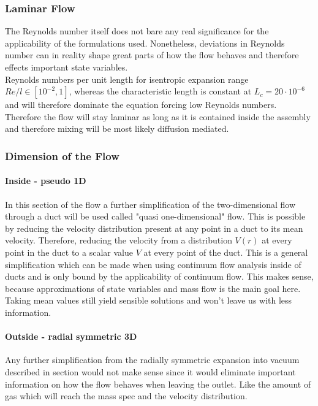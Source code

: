 \subsubsection{Laminar Flow}

	The Reynolds number itself does not bare any real significance for the applicability of the formulations used. Nonetheless, deviations in Reynolds number can in reality shape great parts of how the flow behaves and therefore effects important state variables.\\
	Reynolds numbers per unit length for isentropic expansion range $Re/l \in [10^{-2}, 1]$, whereas the characteristic length is constant at $L_c = 20\cdot 10^{-6}$ and will therefore dominate the equation forcing low Reynolds numbers. \cite{ames1953compressible}\\
	Therefore the flow will stay laminar as long as it is contained inside the assembly and therefore mixing will be most likely diffusion mediated.
	\cite{comsol_microfluidics_guide}
	
\subsubsection{Dimension of the Flow}

	\paragraph{Inside - pseudo 1D}

		In this section of the flow a further simplification of the two-dimensional flow through a duct will be used called "quasi one-dimensional" flow.
		This is possible by reducing the velocity distribution present at any point in a duct to its mean velocity.
		Therefore, reducing the velocity from a distribution $V(r)$ at every point in the duct to a scalar value $V$ at every point of the duct.
		This is a general simplification which can be made when using continuum flow analysis inside of ducts and is only bound by the applicability of continuum flow.
		This makes sense, because approximations of state variables and mass flow is the main goal here.
		Taking mean values still yield sensible solutions and won't leave us with less information.

	\paragraph{Outside - radial symmetric 3D}

		Any further simplification from the radially symmetric expansion into vacuum described in section would not make sense since it would eliminate important information on how the flow behaves when leaving the outlet.
		Like the amount of gas which will reach the mass spec and the velocity distribution.
\cite{anderson2021modern}


